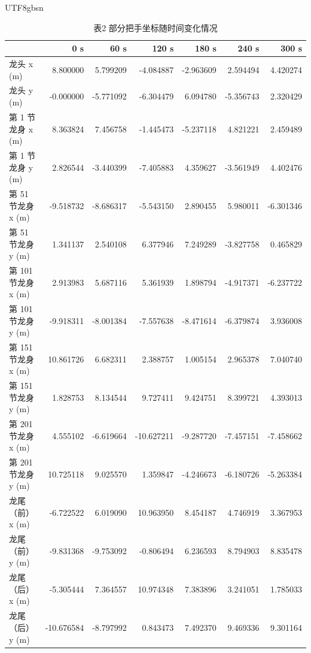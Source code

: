 \documentclass{article}
\begin{document}
	\begin{CJK}{UTF8}{gbsn}
		
		\begin{table}[ht]
			\centering
			\caption*{表2 部分把手坐标随时间变化情况} 
\label{tab:handle_positions}
\begin{tabular}{lrrrrrr}
\toprule
 & 0 s & 60 s & 120 s & 180 s & 240 s & 300 s \\
\midrule
龙头 x (m) & 8.800000 & 5.799209 & -4.084887 & -2.963609 & 2.594494 & 4.420274 \\
龙头 y (m) & -0.000000 & -5.771092 & -6.304479 & 6.094780 & -5.356743 & 2.320429 \\
第 1 节龙身 x (m) & 8.363824 & 7.456758 & -1.445473 & -5.237118 & 4.821221 & 2.459489 \\
第 1 节龙身 y (m) & 2.826544 & -3.440399 & -7.405883 & 4.359627 & -3.561949 & 4.402476 \\
第 51 节龙身 x (m) & -9.518732 & -8.686317 & -5.543150 & 2.890455 & 5.980011 & -6.301346 \\
第 51 节龙身 y (m) & 1.341137 & 2.540108 & 6.377946 & 7.249289 & -3.827758 & 0.465829 \\
第 101 节龙身 x (m) & 2.913983 & 5.687116 & 5.361939 & 1.898794 & -4.917371 & -6.237722 \\
第 101 节龙身 y (m) & -9.918311 & -8.001384 & -7.557638 & -8.471614 & -6.379874 & 3.936008 \\
第 151 节龙身 x (m) & 10.861726 & 6.682311 & 2.388757 & 1.005154 & 2.965378 & 7.040740 \\
第 151 节龙身 y (m) & 1.828753 & 8.134544 & 9.727411 & 9.424751 & 8.399721 & 4.393013 \\
第 201 节龙身 x (m) & 4.555102 & -6.619664 & -10.627211 & -9.287720 & -7.457151 & -7.458662 \\
第 201 节龙身 y (m) & 10.725118 & 9.025570 & 1.359847 & -4.246673 & -6.180726 & -5.263384 \\
龙尾（前） x (m) & -6.722522 & 6.019090 & 10.963950 & 8.454187 & 4.746919 & 3.367953 \\
龙尾（前） y (m) & -9.831368 & -9.753092 & -0.806494 & 6.236593 & 8.794903 & 8.835478 \\
龙尾（后） x (m) & -5.305444 & 7.364557 & 10.974348 & 7.383896 & 3.241051 & 1.785033 \\
龙尾（后） y (m) & -10.676584 & -8.797992 & 0.843473 & 7.492370 & 9.469336 & 9.301164 \\
\bottomrule
\end{tabular}
\end{table}

\end{CJK}
\end{document}
